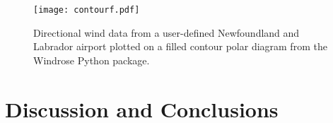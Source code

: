 \documentclass{article}
\begin{document}
\begin{figure}[h!]
\centering
\texttt{[image: contourf.pdf]}
\caption{Directional wind data from a user-defined Newfoundland and Labrador airport plotted on a filled contour polar diagram from the Windrose Python package.}
\label{contourf}
\end{figure}

\clearpage
\section{Discussion and Conclusions}\label{Discussion_and_conclusions}


\clearpage 


\end{document}
